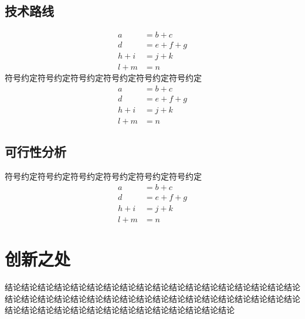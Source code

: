 \begin{ubox}
\subsection{技术路线}
\begin{equation}
	\begin{aligned}
		a &= b + c \\
		d &= e + f + g \\
		h + i &= j + k \\
		l + m &= n
	\end{aligned}
\end{equation}
符号约定符号约定符号约定符号约定符号约定符号约定
\begin{equation}
	\begin{aligned}
		a &= b + c \\
		d &= e + f + g \\
		h + i &= j + k \\
		l + m &= n
	\end{aligned}
\end{equation}
\subsection{可行性分析}
符号约定符号约定符号约定符号约定符号约定符号约定
\begin{equation}
	\begin{aligned}
		a &= b + c \\
		d &= e + f + g \\
		h + i &= j + k \\
		l + m &= n
	\end{aligned}
\end{equation}
\section{创新之处}
结论结论结论结论结论结论结论结论结论结论结论结论结论结论结论结论结论结论结论结论结论结论结论结论结论结论结论结论结论结论结论结论结论结论结论结论结论结论结论结论结论结论结论结论结论结论结论结论结论结论


\end{ubox}
